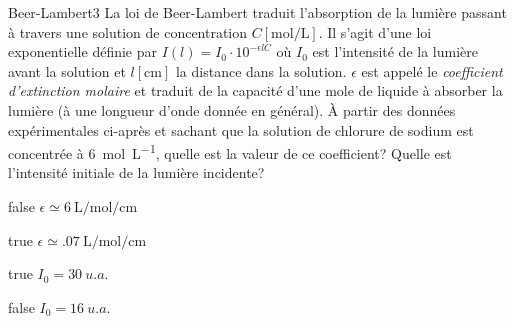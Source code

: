 \documentclass[11pt]{article}
\begin{document}
		\begin{question}{27}{Beer-Lambert}{3}{}
            La loi de Beer-Lambert traduit l'absorption de la lumière passant à travers une solution de concentration $C[\si{\mole\per\liter}]$. Il s'agit d'une loi exponentielle définie par $I(l) = I_0\cdot 10^{-\epsilon l C}$ où $I_0$ est l'intensité de la lumière avant la solution et  $l[\si{\centi\meter}]$ la distance dans la solution. $\epsilon$ est appelé le \emph{coefficient d'extinction molaire} et traduit de la capacité d'une mole de liquide à absorber la lumière (à une longueur d'onde donnée en général). À partir des données expérimentales ci-après et sachant que la solution de chlorure de sodium est concentrée à \SI{6}{\mole\per\liter}, quelle est la valeur de ce coefficient? Quelle est l'intensité initiale de la lumière incidente?
        \begin{figure}
             \end{figure}
        \end{question}
        \begin{reponses}
            \item[false] $\epsilon \simeq \SI{6}{\liter\per\mole\per\centi\meter}$
		    \item[true] $\epsilon \simeq \SI{.07}{\liter\per\mole\per\centi\meter}$
		    \item[true] $I_0 = \SI{30}{{u.a.}}$
		    \item[false] $I_0 = \SI{16}{{u.a.}}$
	    \end{reponses}
		
\end{document}
